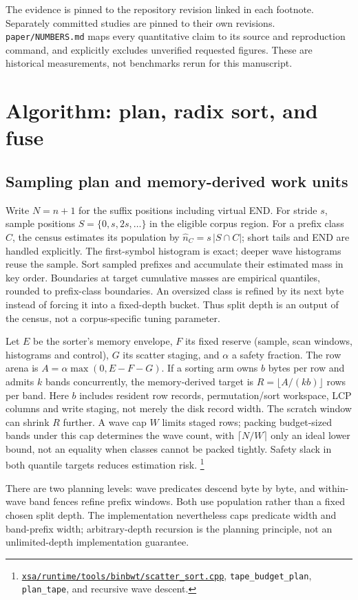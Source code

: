 \documentclass[10pt]{article}
\newcommand{\ev}[2]{\footnote{\href{https://github.com/pangenome/sxgc/blob/c46a85217b9b269c91179cbebc396f96453181af/#1}{\nolinkurl{#1}}, #2.}}
\begin{document}
The evidence is pinned to the repository revision linked in each footnote. Separately committed
studies are pinned to their own revisions. \texttt{paper/NUMBERS.md} maps every quantitative claim
to its source and reproduction command, and explicitly excludes unverified requested figures. These
are historical measurements, not benchmarks rerun for this manuscript.

\section{Algorithm: plan, radix sort, and fuse}
\label{sec:algorithm}
\subsection{Sampling plan and memory-derived work units}
Write $N=n+1$ for the suffix positions including virtual END. For stride $s$, sample positions
$S=\{0,s,2s,\ldots\}$ in the eligible corpus region. For a prefix class $C$, the census estimates
its population by $\widehat n_C=s\,|S\cap C|$; short tails and END are handled explicitly.
The first-symbol histogram is exact; deeper wave histograms reuse the sample. Sort sampled
prefixes and accumulate their estimated mass in key order. Boundaries at target cumulative
masses are empirical quantiles, rounded to prefix-class boundaries. An oversized class is
refined by its next byte instead of forcing it into a fixed-depth bucket. Thus split depth is
an output of the census, not a corpus-specific tuning parameter.

Let $E$ be the sorter's memory envelope, $F$ its fixed reserve (sample, scan windows,
histograms and control), $G$ its scatter staging, and $\alpha$ a safety fraction. The row arena
is $A=\alpha\max(0,E-F-G)$. If a sorting arm owns $b$ bytes per row and admits $k$ bands
concurrently, the memory-derived target is $R=\lfloor A/(kb)\rfloor$ rows per band.
Here $b$ includes resident row records, permutation/sort workspace, LCP columns and write
staging, not merely the disk record width. The scratch window can shrink $R$ further.
A wave cap $W$ limits staged rows; packing budget-sized bands under this cap determines the
wave count, with $\lceil N/W\rceil$ only an ideal lower bound, not an equality when classes
cannot be packed tightly. Safety slack in both quantile targets reduces estimation risk.
\ev{xsa/runtime/tools/binbwt/scatter_sort.cpp}{\texttt{tape\_budget\_plan},
\texttt{plan\_tape}, and recursive wave descent}

There are two planning levels: wave predicates descend byte by byte, and within-wave band
fences refine prefix windows. Both use population rather than a fixed chosen split depth.
The implementation nevertheless caps predicate width and band-prefix width; arbitrary-depth
recursion is the planning principle, not an unlimited-depth implementation guarantee.
\end{document}
